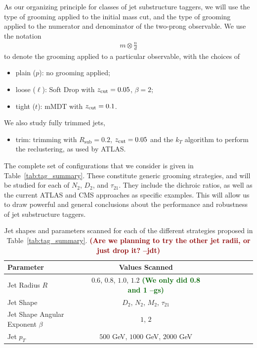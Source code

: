 \documentclass[11pt,letterpaper]{article}
\DeclareRobustCommand{\Tab}[1]{Table~\ref{#1}}
\newcommand{\zcut}{z_{\rm cut}}
\newcommand{\jdt}[1]{\textbf{\textcolor{darkred}{(#1 --jdt)}}}
\newcommand{\gs}[1]{\textbf{\textcolor{darkgreen}{(#1 --gs)}}}
\begin{document}
As our organizing principle for classes of  jet substructure taggers, we will use the type of grooming applied to the initial mass cut, and the type of grooming applied to the numerator and denominator of the two-prong observable.
%
We use the notation 
\begin{align}
m \otimes \frac{n}{d}
\end{align}
to denote the grooming applied to a particular observable, with the choices of
%
\begin{itemize}
\item plain ($p$): no grooming applied;
\item loose ($\ell$): Soft Drop with $\zcut=0.05$, $\beta=2$;
\item tight ($t$): mMDT with $\zcut=0.1$.
\end{itemize}
%
We also study fully trimmed jets,
\begin{itemize}
\item trim: trimming with $R_{\text{sub}}=0.2$,  $ \zcut=0.05$ and the $k_T$ algorithm to perform the reclustering, as used by ATLAS.
\end{itemize}
%
The complete set of configurations that we consider is given in \Tab{tab:tag_summary}.
%
These constitute generic grooming strategies, and will be studied for each of $N_2$, $D_2$, and $\tau_{21}$.
%
They include the dichroic ratios, as well as the current ATLAS and CMS approaches as specific examples.
%
This will allow us to draw powerful and general conclusions about the performance and robustness of jet substructure taggers.


\begin{table}
\begin{center}
\begin{tabular}{| l | c | c |c |c|c|c |c|r| }
  \hline                       
  Parameter &  Values Scanned \\
  \hline
  Jet Radius $R$ &   $0.6$, $0.8$, $1.0$, $1.2$ \gs{We only did 0.8 and 1} \\
  Jet Shape  &   $D_2$, $N_2$, $M_2$, $\tau_{21}$  \\
  Jet Shape Angular Exponent $\beta$ &   $1$, $2$ \\
  Jet $p_T$ &   $500$ GeV, $1000$ GeV, $2000$ GeV  \\
  \hline  
\end{tabular}
\end{center}
\caption{
Jet shapes and parameters scanned for each of the different strategies proposed in \Tab{tab:tag_summary}.  \jdt{Are we planning to try the other jet radii, or just drop it?}
}
\label{tab:params}
\end{table}
\end{document}
